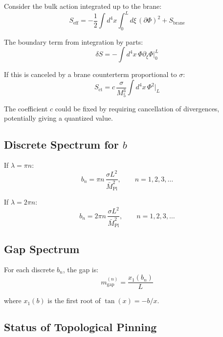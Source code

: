 \documentclass[11pt,a4paper]{article}
\newcommand{\Mpl}{\bar{M}_{\mathrm{Pl}}}
\newcommand{\Mfive}{M_5}
\newcommand{\mgap}{m_{\mathrm{gap}}}
\theoremstyle{definition}
\theoremstyle{plain}
\theoremstyle{remark}
\begin{document}
Consider the bulk action integrated up to the brane:
\begin{equation}
S_{\mathrm{eff}} = -\frac{1}{2}\int d^4x \int_0^L d\xi \, (\partial\Phi)^2 + S_{\mathrm{brane}}
\label{eq:bulk-integrated}
\end{equation}

The boundary term from integration by parts:
\begin{equation}
\delta S = -\int d^4x \, \Phi \partial_\xi\Phi \big|_0^L
\label{eq:boundary-term}
\end{equation}

If this is canceled by a brane counterterm proportional to $\sigma$:
\begin{equation}
S_{\mathrm{ct}} = c \, \frac{\sigma}{\Mfive^3} \int d^4x \, \Phi^2\big|_{L}
\label{eq:counterterm}
\end{equation}

The coefficient $c$ could be fixed by requiring cancellation of divergences,
potentially giving a quantized value.

\subsection{Discrete Spectrum for $b$}

If $\lambda = \pi n$:
\begin{equation}
b_n = \pi n \, \frac{\sigma L^2}{\Mpl^2}, \qquad n = 1, 2, 3, \ldots
\label{eq:bn-pi}
\end{equation}

If $\lambda = 2\pi n$:
\begin{equation}
b_n = 2\pi n \, \frac{\sigma L^2}{\Mpl^2}, \qquad n = 1, 2, 3, \ldots
\label{eq:bn-2pi}
\end{equation}

\subsection{Gap Spectrum}

For each discrete $b_n$, the gap is:
\begin{equation}
\mgap^{(n)} = \frac{x_1(b_n)}{L}
\label{eq:gap-n}
\end{equation}

where $x_1(b)$ is the first root of $\tan(x) = -b/x$.

\subsection{Status of Topological Pinning}
\end{document}
